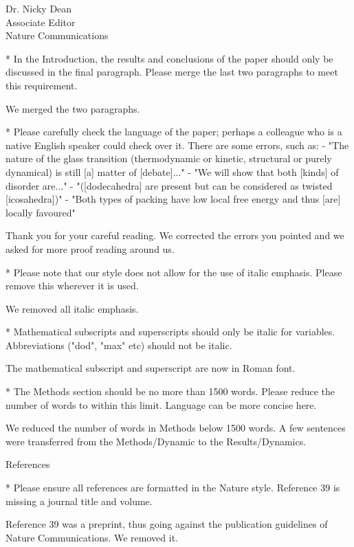 \documentclass[a4paper, rebuttal, parskip=true, firsthead=false, fromemail=true, foldmarks=false]{scrlttr2}
\begin{document}
\begin{letter}{Dr. Nicky Dean\\
Associate Editor\\
Nature Communications}
\begin{quotationi}
* In the Introduction, the results and conclusions of the paper should only be discussed in the final paragraph. Please merge the last two paragraphs to meet this requirement.
\end{quotationi}
We merged the two paragraphs.

\begin{quotationi}
* Please carefully check the language of the paper; perhaps a colleague who is a native English speaker could check over it. There are some errors, such as:
- "The nature of the glass transition (thermodynamic or kinetic, structural or purely dynamical) is still [a] matter of [debate]..."
- "We will show that both [kinds] of disorder are..."
- "([dodecahedra] are present but can be considered as twisted [icosahedra])"
- "Both types of packing have low local free energy and thus [are] locally favoured"
\end{quotationi}
Thank you for your careful reading. We corrected the errors you pointed and we asked for more proof reading around us.

\begin{quotationi}
* Please note that our style does not allow for the use of italic emphasis. Please remove this wherever it is used.
\end{quotationi}
We removed all italic emphasis.

\begin{quotationi}
* Mathematical subscripts and superscripts should only be italic for variables. Abbreviations ("dod", "max" etc) should not be italic.
\end{quotationi}
The mathematical subscript and superscript are now in Roman font.

\begin{quotationi}
* The Methods section should be no more than 1500 words. Please reduce the number of words to within this limit. Language can be more concise here.
\end{quotationi}
We reduced the number of words in Methods below 1500 words. A few sentences were transferred from the Methods/Dynamic to the Results/Dynamics.

\textsf{References}
\begin{quotationi}
* Please ensure all references are formatted in the Nature style. Reference 39 is missing a journal title and volume.
\end{quotationi}
Reference 39 was a preprint, thus going against the publication guidelines of Nature Communications. We removed it.


\end{letter}
\end{document}
